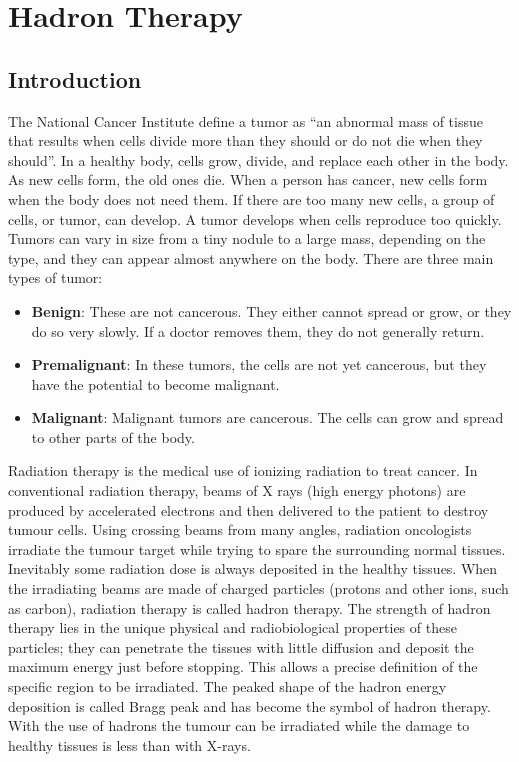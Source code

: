 \chapter{Hadron Therapy}

\section{Introduction}
The National Cancer Institute define a tumor\cite{tumor} as “an abnormal mass of tissue that results when cells divide more than they should or do not die when they should”.
In a healthy body, cells grow, divide, and replace each other in the body. As new cells form, the old ones die. When a person has cancer, new cells form when the body does not need them. If there are too many new cells, a group of cells, or tumor, can develop.
A tumor develops when cells reproduce too quickly. Tumors can vary in size from a tiny nodule to a large mass, depending on the type, and they can appear almost anywhere on the body.
There are three main types of tumor:
\begin{itemize}
\item \textbf{Benign}: These are not cancerous. They either cannot spread or grow, or they do so very slowly. If a doctor removes them, they do not generally return.
\item \textbf{Premalignant}: In these tumors, the cells are not yet cancerous, but they have the potential to become malignant.
\item \textbf{Malignant}: Malignant tumors are cancerous. The cells can grow and spread to other parts of the body.
\end{itemize}
Radiation therapy is the medical use of ionizing radiation to treat cancer. In conventional radiation therapy, beams of X rays (high energy photons) are produced by accelerated electrons and then delivered to the patient to destroy tumour cells. Using crossing beams from many angles, radiation oncologists irradiate the tumour target while trying to spare the surrounding normal tissues. Inevitably some radiation dose is always deposited in the healthy tissues.
When the irradiating beams are made of charged particles (protons and other ions, such as carbon), radiation therapy is called hadron therapy\cite{radiationtherapy}. The strength of hadron therapy lies in the unique physical and radiobiological properties of these particles; they can penetrate the tissues with little diffusion and deposit the maximum energy just before stopping. This allows a precise definition of the specific region to be irradiated. The peaked shape of the hadron energy deposition is called Bragg peak and has become the symbol of hadron therapy. With the use of hadrons the tumour can be irradiated while the damage to healthy tissues is less than with X-rays.

